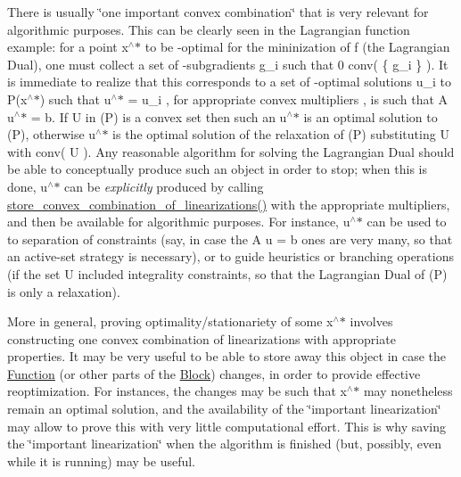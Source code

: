 There is usually \char`\"{}one important convex combination\char`\"{} that is very relevant for algorithmic purposes. This can be clearly seen in the Lagrangian function example\+: for a point x$^\wedge$$\ast$ to be -\/optimal for the mininization of f (the Lagrangian Dual), one must collect a set of -\/subgradients g\+\_\+i such that 0  conv( \{ g\+\_\+i \} ). It is immediate to realize that this corresponds to a set of -\/optimal solutions u\+\_\+i to P(x$^\wedge$$\ast$) such that u$^\wedge$$\ast$ =  u\+\_\+i , for appropriate convex multipliers , is such that A u$^\wedge$$\ast$ = b. If U in (P) is a convex set then such an u$^\wedge$$\ast$ is an optimal solution to (P), otherwise u$^\wedge$$\ast$ is the optimal solution of the relaxation of (P) substituting U with conv( U ). Any reasonable algorithm for solving the Lagrangian Dual should be able to conceptually produce such an object in order to stop; when this is done, u$^\wedge$$\ast$ can be {\itshape explicitly} produced by calling \mbox{\hyperlink{class_s_m_spp__di__unipi__it_1_1_c05_function_aa711d56d6e59b22f499eb0486df87699}{store\+\_\+convex\+\_\+combination\+\_\+of\+\_\+linearizations()}} with the appropriate multipliers, and then be available for algorithmic purposes. For instance, u$^\wedge$$\ast$ can be used to to separation of constraints (say, in case the A u = b ones are very many, so that an active-\/set strategy is necessary), or to guide heuristics or branching operations (if the set U included integrality constraints, so that the Lagrangian Dual of (P) is only a relaxation).

More in general, proving optimality/stationariety of some x$^\wedge$$\ast$ involves constructing one convex combination of linearizations with appropriate properties. It may be very useful to be able to store away this object in case the \mbox{\hyperlink{class_s_m_spp__di__unipi__it_1_1_function}{Function}} (or other parts of the \mbox{\hyperlink{class_s_m_spp__di__unipi__it_1_1_block}{Block}}) changes, in order to provide effective reoptimization. For instances, the changes may be such that x$^\wedge$$\ast$ may nonetheless remain an optimal solution, and the availability of the \char`\"{}important linearization\char`\"{} may allow to prove this with very little computational effort. This is why saving the \char`\"{}important linearization\char`\"{} when the algorithm is finished (but, possibly, even while it is running) may be useful.

